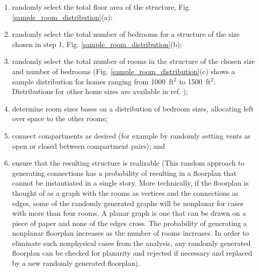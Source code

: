 \documentclass[12pt,twoside]{book}
\begin{document}
\begin{enumerate}
    \item randomly select the total floor area of the structure, Fig. \ref{sample_room_distribution}(a); 
    \item randomly select the total number of bedrooms for a structure of the size chosen in step 1, Fig. \ref{sample_room_distribution}(b); 
    \item randomly select the total number of rooms in the structure of the chosen size and number of bedrooms (Fig. \ref{sample_room_distribution}(c) shows a sample distribution for homes ranging from 1000~ft$^2$ to 1500~ft$^2$. Distributions for other home sizes are available in ref. \cite{AHS2015});
    \item determine room sizes bases on a distribution of bedroom sizes, allocating left over space to the other rooms; 
    \item connect compartments as desired (for example by randomly setting vents as open or closed between compartment pairs); and 
    \item ensure that the resulting structure is realizable (This random approach to generating connections has a probability of resulting in a floorplan that cannot be instantiated in a single story. More technically, if the floorplan is thought of as a graph with the rooms as vertices and the connections as edges, some of the randomly generated graphs will be nonplanar for cases with more than four rooms. A planar graph is one that can be drawn on a piece of paper and none of the edges cross. The probability of generating a nonplanar floorplan increases as the number of rooms increases. In order to eliminate such nonphysical cases from the analysis, any randomly generated floorplan can be checked for planarity and rejected if necessary and replaced by a new randomly generated floorplan).
\end{enumerate}
\end{document}
